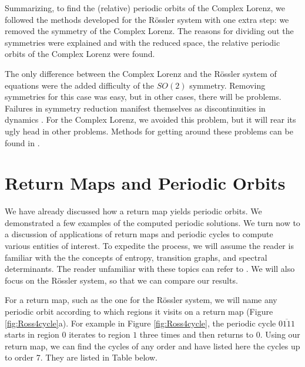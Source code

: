 \documentclass[12 pt]{article}
\begin{document}
Summarizing, to find the (relative) periodic orbits of the Complex Lorenz, we followed the methods developed for the R\"ossler system with one extra step: we removed the symmetry of the Complex Lorenz.  The reasons for dividing out the symmetries were explained and with the reduced space, the relative periodic orbits of the Complex Lorenz were found.

The only difference between the Complex Lorenz and the R\"ossler system of equations were the added difficulty of the $SO(2)$ symmetry.  Removing symmetries for this case was easy, but in other cases, there will be problems.  Failures in symmetry reduction manifest themselves as discontinuities in dynamics \cite{Atl}.  For the Complex Lorenz, we avoided this problem, but it will rear its ugly head in other problems.  Methods for getting around these problems can be found in \cite{Atl}.

\section{Return Maps and Periodic Orbits}
\label{sec:Retmaps}
We have already discussed how a return map yields periodic orbits.  We demonstrated a few examples of the computed periodic solutions.  We turn now to a discussion of applications of return maps and periodic cycles to compute various entities of interest.  To expedite the process, we will assume the reader is familiar with the the concepts of entropy, transition graphs, and spectral determinants.  The reader unfamiliar with these topics can refer to \cite{CB}.  We will also focus on the R\"ossler system, so that we can compare our results.

For a return map, such as the one for the R\"ossler system, we will name any periodic orbit according to which regions it visits on a return map (Figure \ref{fig:Ross4cycle}a).  For example in Figure \ref{fig:Ross4cycle}, the periodic cycle $\overline{0111}$ starts in region $0$ iterates to region $1$ three times and then returns to $0$.  Using our return map, we can find the cycles of any order and have listed here the cycles up to order 7.  They are listed in Table below.
\end{document}
